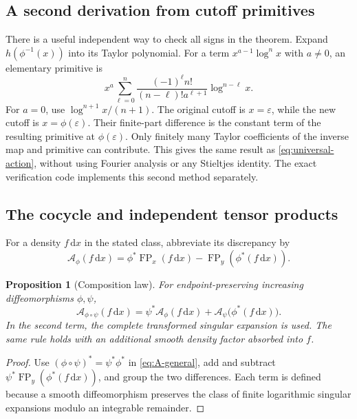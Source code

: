 \documentclass[11pt]{article}
\newtheorem{proposition}[theorem]{Proposition}
\theoremstyle{definition}\newtheorem{definition}[theorem]{Definition}
\theoremstyle{remark}\newtheorem{remark}[theorem]{Remark}
\DeclareMathOperator{\FP}{FP}
\newcommand{\dd}{\,\mathrm d}
\newcommand{\eps}{\varepsilon}
\newcommand{\Ac}{\mathcal A}
\begin{document}
\subsection{A second derivation from cutoff primitives}
There is a useful independent way to check all signs in the theorem. Expand
$h(\phi^{-1}(x))$ into its Taylor polynomial. For a term $x^{a-1}\log^n x$ with $a\ne0$, an elementary primitive is
\begin{equation}\label{eq:elementary-primitive}
x^a\sum_{\ell=0}^{n}
\frac{(-1)^\ell n!}{(n-\ell)!a^{\ell+1}}\log^{n-\ell}x.
\end{equation}
For $a=0$, use $\log^{n+1}x/(n+1)$. The original cutoff is $x=\eps$, while the new cutoff is $x=\phi(\eps)$. Their finite-part difference is the constant term of the resulting primitive at $\phi(\eps)$. Only finitely many Taylor coefficients of the inverse map and primitive can contribute. This gives the same result as \eqref{eq:universal-action}, without using Fourier analysis or any Stieltjes identity. The exact verification code implements this second method separately.

\subsection{The cocycle and independent tensor products}
For a density $f\dd x$ in the stated class, abbreviate its discrepancy by
\begin{equation}\label{eq:A-general}
\Ac_\phi(f\dd x)=\phi^*\FP_x(f\dd x)-\FP_y(\phi^*(f\dd x)).
\end{equation}
\begin{proposition}[Composition law]\label{prop:cocycle}
For endpoint-preserving increasing diffeomorphisms $\phi,\psi$,
\begin{equation}\label{eq:cocycle}
\Ac_{\phi\circ\psi}(f\dd x)
=\psi^*\Ac_\phi(f\dd x)+\Ac_\psi\bigl(\phi^*(f\dd x)\bigr).
\end{equation}
In the second term, the complete transformed singular expansion is used. The same rule holds with an additional smooth density factor absorbed into $f$.
\end{proposition}
\begin{proof}
Use $(\phi\circ\psi)^*=\psi^*\phi^*$ in \eqref{eq:A-general}, add and subtract
$\psi^*\FP_y(\phi^*(f\dd x))$, and group the two differences. Each term is defined because a smooth diffeomorphism preserves the class of finite logarithmic singular expansions modulo an integrable remainder.
\end{proof}
\end{document}
